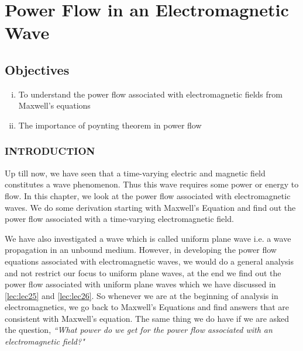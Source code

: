 \chapter{Power Flow in an Electromagnetic Wave}\label{lec:lec27}

\begin{mdframed}[backgroundcolor=lightblue, linewidth=1pt,  hidealllines=true]
\section{Objectives}
\begin{enumerate}[(i)]
\item To understand the power flow associated with electromagnetic fields from Maxwell's equations
\item The importance of poynting theorem in power flow
\end{enumerate}
\end{mdframed}
\subsection{INTRODUCTION}
Up till now, we have seen that a time-varying electric and magnetic field constitutes a wave phenomenon. Thus this wave requires some power or energy to flow. In this chapter, we look at the power flow associated with electromagnetic waves. We do some derivation starting with Maxwell's Equation and find out the power flow associated with a time-varying electromagnetic field.

We have also investigated a wave which is called uniform plane wave i.e. a wave propagation in an unbound medium. However, in developing the power flow equations associated with electromagnetic waves, we would do a general analysis and not restrict our focus to uniform plane waves, at the end we find out the power flow associated with uniform plane waves which we have discussed in \autoref{lec:lec25} and \autoref{lec:lec26}. So whenever we are at the beginning of analysis in electromagnetics, we go back to Maxwell's Equations and find answers that are consistent with Maxwell's equation. The same thing we do have if we are asked the question,  \emph{``What power do we get for the power flow associated with an electromagnetic field?"}


